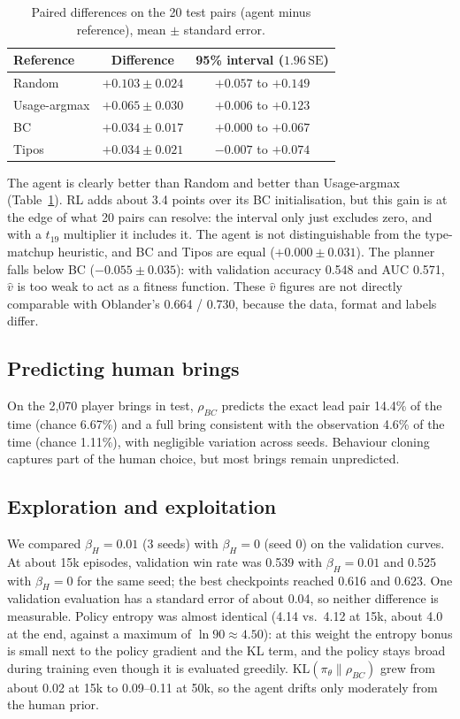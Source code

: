 \begin{table}[t]
\centering
\caption{Paired differences on the 20 test pairs (agent minus reference), mean $\pm$ standard error.}
\label{tab:diff}
\begin{tabular}{lcc}
\hline
Reference & Difference & 95\% interval ($1.96\,\mathrm{SE}$) \\
\hline
Random & $+0.103\pm0.024$ & $+0.057$ to $+0.149$ \\
Usage-argmax & $+0.065\pm0.030$ & $+0.006$ to $+0.123$ \\
BC & $+0.034\pm0.017$ & $+0.000$ to $+0.067$ \\
Tipos & $+0.034\pm0.021$ & $-0.007$ to $+0.074$ \\
\hline
\end{tabular}
\end{table}
The agent is clearly better than Random and better than Usage-argmax (Table~\ref{tab:diff}).
RL adds about 3.4 points over its BC initialisation, but this gain is at the edge of what 20 pairs can resolve:
the interval only just excludes zero, and with a $t_{19}$ multiplier it includes it.
The agent is not distinguishable from the type-matchup heuristic, and BC and Tipos are equal ($+0.000\pm0.031$).
The planner falls below BC ($-0.055\pm0.035$): with validation accuracy 0.548 and AUC 0.571, $\hat v$ is too weak to
act as a fitness function. These $\hat v$ figures are not directly comparable with Oblander's 0.664 / 0.730, because
the data, format and labels differ.

\subsection{Predicting human brings}
On the 2{,}070 player brings in test, $\rho_{BC}$ predicts the exact lead pair 14.4\% of the time (chance 6.67\%)
and a full bring consistent with the observation 4.6\% of the time (chance 1.11\%), with negligible variation
across seeds. Behaviour cloning captures part of the human choice, but most brings remain unpredicted.

\subsection{Exploration and exploitation}
We compared $\beta_H=0.01$ (3 seeds) with $\beta_H=0$ (seed 0) on the validation curves.
At about 15k episodes, validation win rate was 0.539 with $\beta_H=0.01$ and 0.525 with $\beta_H=0$ for the same seed;
the best checkpoints reached 0.616 and 0.623. One validation evaluation has a standard error of about 0.04, so neither
difference is measurable. Policy entropy was almost identical (4.14 vs.\ 4.12 at 15k, about 4.0 at the end, against a
maximum of $\ln 90\approx4.50$): at this weight the entropy bonus is small next to the policy gradient and the KL term,
and the policy stays broad during training even though it is evaluated greedily.
$\mathrm{KL}(\pi_\theta\|\rho_{BC})$ grew from about 0.02 at 15k to 0.09--0.11 at 50k, so the agent drifts only
moderately from the human prior.


